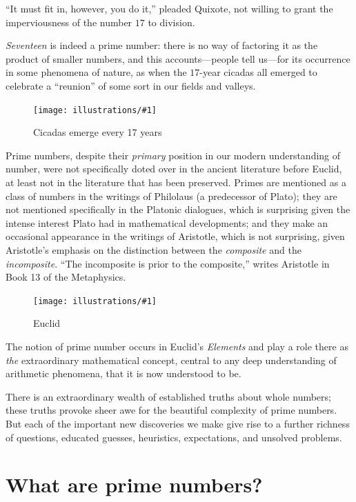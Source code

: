 \documentclass[openany]{book}
\newcommand{\ill}[3]{%
   \begin{figure}[H]%
   \vspace{-2ex}
   \centering%
   \texttt{[image: illustrations/\#1]}%
   \caption{#3}%
   \vspace{-2ex}
    \end{figure}}
\theoremstyle{plain}
\theoremstyle{definition}
\begin{document}
``It must fit in, however, you do it,'' pleaded Quixote, not willing to
grant the imperviousness of the number $17$ to division.





{\em Seventeen} is indeed a prime number: there is no way of factoring
it as the product of smaller numbers, and this accounts---people tell
us---for its occurrence in some phenomena of nature, as when
the $17$-year cicadas all emerged to celebrate a ``reunion'' of some
sort in our fields and valleys.

\ill{cicada}{.3}{Cicadas emerge every 17 years}




Prime numbers, despite their {\em primary} position in our modern
understanding of number, were not specifically doted over in the
ancient literature before Euclid, at least not in the literature that
has been preserved. Primes are mentioned as a class of numbers in the
writings of Philolaus (a predecessor of Plato); they are not mentioned
specifically in the Platonic dialogues, which is surprising
given the intense interest Plato had in mathematical developments; and
they make an occasional appearance in the writings of Aristotle, which
is not surprising, given Aristotle's emphasis on the distinction
between the {\em composite} and the {\em incomposite}. ``The
incomposite is prior to the composite,'' writes Aristotle in Book 13 of
the Metaphysics.

\ill{euclid}{.3}{Euclid}

The notion of  prime number occurs in  Euclid's  {\it Elements}  and play a role there as
{\em the} extraordinary mathematical concept, central to any deep
understanding of arithmetic phenomena, that it is now understood to
be.




There is an extraordinary wealth of established truths about whole
numbers; these truths provoke sheer awe for the beautiful complexity
of prime numbers. But each of the important new discoveries we make
give rise to a further richness of questions, educated guesses,
heuristics, expectations, and unsolved problems.



\chapter{What are prime numbers?}\label{ch:what_are_primes}
\end{document}
